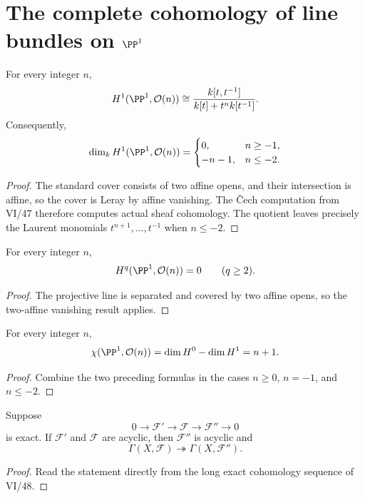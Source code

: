 \section{The complete cohomology of line bundles on \texorpdfstring{$\PP^1$}{P1}}

\begin{theorem}\label{thm:vi49-p1-h1}
For every integer $n$,
\[
H^1(\PP^1,\mathcal O(n))\cong
\frac{k[t,t^{-1}]}{k[t]+t^n k[t^{-1}]}.
\]
Consequently,
\[
\dim_k H^1(\PP^1,\mathcal O(n))=
\begin{cases}
0,&n\ge-1,\\
-n-1,&n\le-2.
\end{cases}
\]
\begin{proof}
The standard cover consists of two affine opens, and their intersection is affine, so the cover is Leray by affine vanishing. The Čech computation from VI/47 therefore computes actual sheaf cohomology. The quotient leaves precisely the Laurent monomials $t^{n+1},\ldots,t^{-1}$ when $n\le-2$.
\end{proof}
\end{theorem}

\begin{corollary}\label{cor:vi49-p1-higher}
For every integer $n$,
\[
H^q(\PP^1,\mathcal O(n))=0\qquad(q\ge2).
\]
\begin{proof}
The projective line is separated and covered by two affine opens, so the two-affine vanishing result applies.
\end{proof}
\end{corollary}

\begin{proposition}\label{prop:vi49-p1-euler}
For every integer $n$,
\[
\chi(\PP^1,\mathcal O(n))
=\dim H^0-\dim H^1
=n+1.
\]
\begin{proof}
Combine the two preceding formulas in the cases $n\ge0$, $n=-1$, and $n\le-2$.
\end{proof}
\end{proposition}

\begin{proposition}\label{prop:vi49-acyclic-quotient}
Suppose
\[
0\to\mathcal F'\to\mathcal F\to\mathcal F''\to0
\]
is exact. If $\mathcal F'$ and $\mathcal F$ are acyclic, then $\mathcal F''$ is acyclic and
\[
\Gamma(X,\mathcal F)\twoheadrightarrow\Gamma(X,\mathcal F'').
\]
\begin{proof}
Read the statement directly from the long exact cohomology sequence of VI/48.
\end{proof}
\end{proposition}

